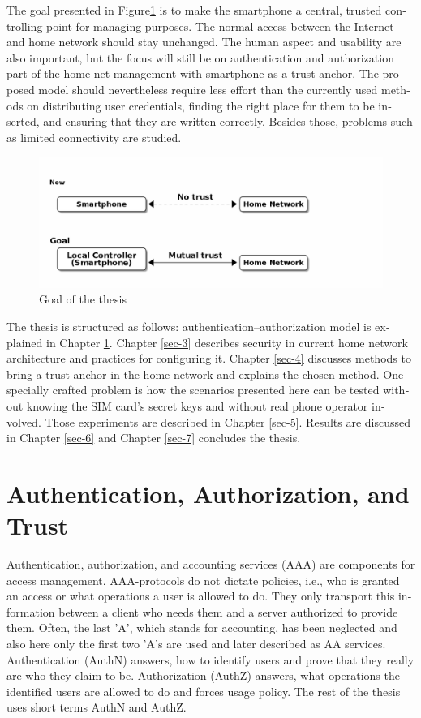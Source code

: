 \documentclass[12pt,a4paper,english]{tutthesis}
\begin{document}
\begin{otherlanguage}{english}
The goal presented in Figure\ref{fig:intro-goal} is to make the smartphone a central, trusted controlling 
point for managing purposes. The normal access between the
Internet and home network should stay unchanged. 
The human aspect and usability are also important, but the focus will
still be on authentication and authorization part of the home net
management with smartphone as a trust anchor.  The proposed model
should nevertheless require less effort than the currently used methods
on distributing user credentials, finding the right place for them to be
inserted, and ensuring that they are written correctly.
Besides those, problems such as limited connectivity are
studied.
\begin{figure}[htb]
\centering
\includegraphics[width=.9\linewidth]{intro-goal.png}
\caption{\label{fig:intro-goal}Goal of the thesis}
\end{figure}





The thesis is structured as follows: authentication--authorization
model is explained in Chapter \ref{sec-2}.  Chapter \ref{sec-3}
describes security in current home network architecture and 
practices for configuring it.  Chapter \ref{sec-4} discusses methods
to bring a trust anchor in the home network and explains the chosen
method.
One specially crafted problem is how the scenarios presented here can be
tested without knowing the SIM card's secret keys and without real phone
operator involved.  Those experiments are described in Chapter \ref{sec-5}.
Results are discussed in Chapter \ref{sec-6} and Chapter \ref{sec-7} concludes the
thesis.
\chapter{Authentication, Authorization, and Trust}
\label{sec-2}



Authentication, authorization, and accounting services (AAA) are
components for access management.  AAA-protocols do not dictate
policies, i.e., who is granted an access or what operations a user is
allowed to do. They only transport this information between a client
who needs them and a server authorized to provide them.
Often, the last 'A', which stands for accounting, has been neglected
and also here only the first two 'A's are used and later described as AA
services. Authentication (AuthN) answers, how to identify users and
prove that they really are who they claim to be. Authorization (AuthZ)
answers, what operations the identified users are allowed to do and
forces usage policy. The rest of the thesis uses short terms AuthN
and AuthZ.


\end{otherlanguage}
\end{document}
